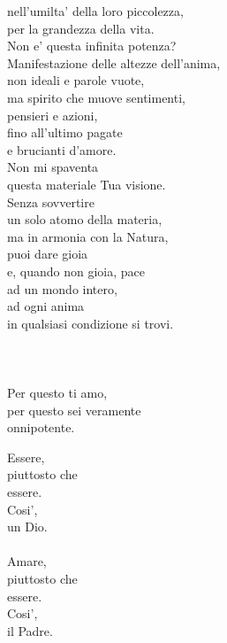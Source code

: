 \begin{haiku}
nell'umilta' della loro piccolezza,\\
per la grandezza della vita.\\
Non e' questa infinita potenza?\\
Manifestazione delle altezze dell'anima,\\
non ideali e parole vuote,\\
ma spirito che muove sentimenti, \\
pensieri e azioni,\\
fino all'ultimo pagate\\
e brucianti d'amore.\\
Non mi spaventa \\
    questa materiale Tua visione.\\
Senza sovvertire \\
    un solo atomo della materia,\\
ma in armonia con la Natura,\\
    puoi dare gioia \\
    e, quando non gioia, pace\\
ad un mondo intero, \\
    ad ogni anima\\
in qualsiasi condizione si trovi.\\
\leavevmode\\
\leavevmode\\
\leavevmode\\
Per questo ti amo,\\
per questo sei veramente \\
    onnipotente.\\
\end{haiku}

\begin{haiku}
    Essere,\\
    piuttosto che\\
    essere.\\
    Cosi',\\
    un Dio.\\
    \leavevmode\\
    Amare,\\
    piuttosto che\\
    essere.\\
    Cosi',\\
    il Padre.\\

\end{haiku}

